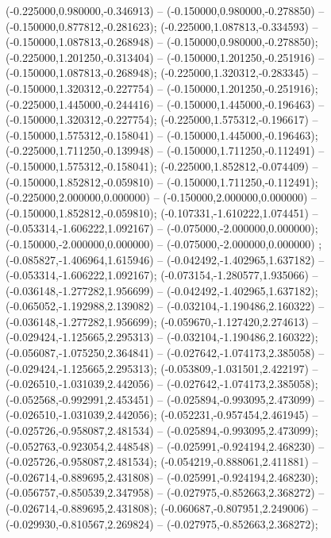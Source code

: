  (-0.225000,0.980000,-0.346913) -- (-0.150000,0.980000,-0.278850) -- (-0.150000,0.877812,-0.281623);
 (-0.225000,1.087813,-0.334593) -- (-0.150000,1.087813,-0.268948) -- (-0.150000,0.980000,-0.278850);
 (-0.225000,1.201250,-0.313404) -- (-0.150000,1.201250,-0.251916) -- (-0.150000,1.087813,-0.268948);
 (-0.225000,1.320312,-0.283345) -- (-0.150000,1.320312,-0.227754) -- (-0.150000,1.201250,-0.251916);
 (-0.225000,1.445000,-0.244416) -- (-0.150000,1.445000,-0.196463) -- (-0.150000,1.320312,-0.227754);
 (-0.225000,1.575312,-0.196617) -- (-0.150000,1.575312,-0.158041) -- (-0.150000,1.445000,-0.196463);
 (-0.225000,1.711250,-0.139948) -- (-0.150000,1.711250,-0.112491) -- (-0.150000,1.575312,-0.158041);
 (-0.225000,1.852812,-0.074409) -- (-0.150000,1.852812,-0.059810) -- (-0.150000,1.711250,-0.112491);
 (-0.225000,2.000000,0.000000) -- (-0.150000,2.000000,0.000000) -- (-0.150000,1.852812,-0.059810);
 (-0.107331,-1.610222,1.074451) -- (-0.053314,-1.606222,1.092167) -- (-0.075000,-2.000000,0.000000);
 (-0.150000,-2.000000,0.000000) -- (-0.075000,-2.000000,0.000000) ;
 (-0.085827,-1.406964,1.615946) -- (-0.042492,-1.402965,1.637182) -- (-0.053314,-1.606222,1.092167);
 (-0.073154,-1.280577,1.935066) -- (-0.036148,-1.277282,1.956699) -- (-0.042492,-1.402965,1.637182);
 (-0.065052,-1.192988,2.139082) -- (-0.032104,-1.190486,2.160322) -- (-0.036148,-1.277282,1.956699);
 (-0.059670,-1.127420,2.274613) -- (-0.029424,-1.125665,2.295313) -- (-0.032104,-1.190486,2.160322);
 (-0.056087,-1.075250,2.364841) -- (-0.027642,-1.074173,2.385058) -- (-0.029424,-1.125665,2.295313);
 (-0.053809,-1.031501,2.422197) -- (-0.026510,-1.031039,2.442056) -- (-0.027642,-1.074173,2.385058);
 (-0.052568,-0.992991,2.453451) -- (-0.025894,-0.993095,2.473099) -- (-0.026510,-1.031039,2.442056);
 (-0.052231,-0.957454,2.461945) -- (-0.025726,-0.958087,2.481534) -- (-0.025894,-0.993095,2.473099);
 (-0.052763,-0.923054,2.448548) -- (-0.025991,-0.924194,2.468230) -- (-0.025726,-0.958087,2.481534);
 (-0.054219,-0.888061,2.411881) -- (-0.026714,-0.889695,2.431808) -- (-0.025991,-0.924194,2.468230);
 (-0.056757,-0.850539,2.347958) -- (-0.027975,-0.852663,2.368272) -- (-0.026714,-0.889695,2.431808);
 (-0.060687,-0.807951,2.249006) -- (-0.029930,-0.810567,2.269824) -- (-0.027975,-0.852663,2.368272);
